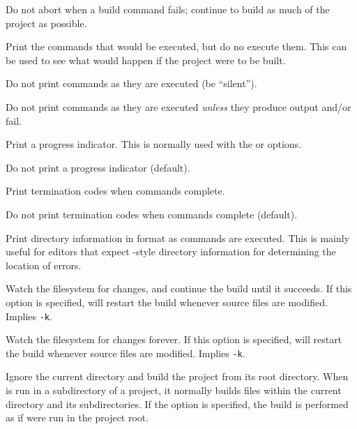 \begin{description}\setlength{\itemsep}{0cm}
\item[\Opt{-k}] Do not abort when a build command fails;
continue to build as much of the project as possible.

\item[\Opt{-n}] Print the commands that would be executed, but do no execute them.
This can be used to see what would happen if the project were to be built.

\item[\Opt{-s}] Do not print commands as they are executed (be ``silent'').

\item[\Opt{-S}] Do not print commands as they are executed \emph{unless} they produce output and/or
fail.

\item[\Opt{-{}-progress}] Print a progress indicator.
This is normally used with the  or  options.

\item[\Opt{-{}-no-progress}] Do not print a progress indicator (default).

\item[\Opt{-{}-print-exit}] Print termination codes when commands complete.

\item[\Opt{-{}-no-print-exit}] Do not print termination codes when commands complete (default).

\item[\Opt{-w}] Print directory information in  format as commands are executed.
This is mainly useful for editors that expect -style
directory information for determining the location of errors.

\item[\Opt{-p}] Watch the filesystem for changes, and continue the build until it succeeds.  If this
option is specified,  will restart the build whenever source files are modified. Implies
\texttt{-k}.

\item[\Opt{-P}] Watch the filesystem for changes forever.  If this option is specified, 
will restart the build whenever source files are modified. Implies
\texttt{-k}.

\item[\Opt{-R}] Ignore the current directory and build the project from its root directory.  When
 is run in a subdirectory of a project, it normally builds files within the current
directory and its subdirectories.  If the  option is specified, the build is performed as if
 were run in the project root.


\end{description}
